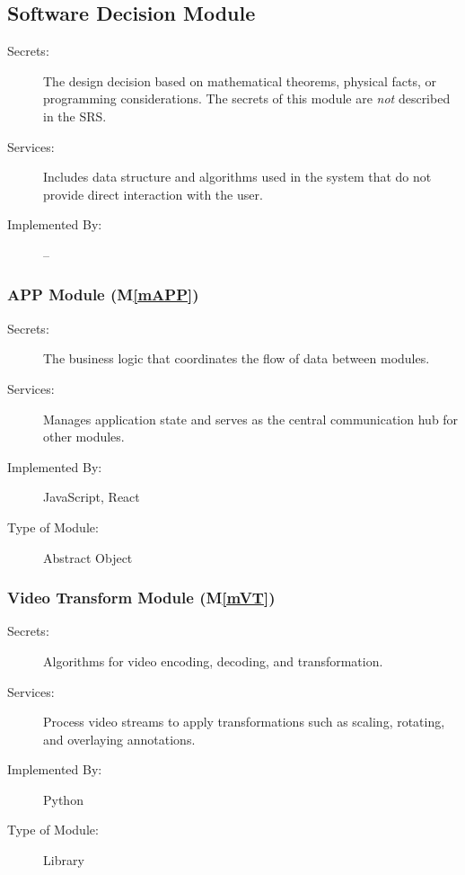 \documentclass[12pt, titlepage]{article}
\newcommand{\mref}[1]{M\ref{#1}}
\begin{document}
\subsection{Software Decision Module}

\begin{description}
\item[Secrets:] The design decision based on mathematical theorems, physical
  facts, or programming considerations. The secrets of this module are
  \emph{not} described in the SRS.
\item[Services:] Includes data structure and algorithms used in the system that
  do not provide direct interaction with the user. 
\item[Implemented By:] --
\end{description}

\subsubsection{APP Module (\mref{mAPP})}

\begin{description}
\item[Secrets:] The business logic that coordinates the flow of data between modules.
\item[Services:] Manages application state and serves as the central communication hub for other modules.
\item[Implemented By:] JavaScript, React
\item[Type of Module:] Abstract Object
\end{description}

\subsubsection{Video Transform Module (\mref{mVT})}

\begin{description}
\item[Secrets:] Algorithms for video encoding, decoding, and transformation.
\item[Services:] Process video streams to apply transformations such as scaling, rotating, and overlaying annotations.
\item[Implemented By:] Python
\item[Type of Module:] Library
\end{description}
\end{document}
